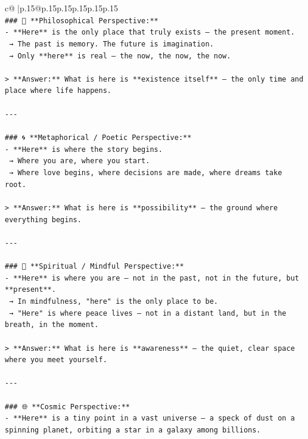 \documentclass{article}
\begin{document}
{\begin{supertabular}{c@{$\;$}|p{.15\linewidth}@{}p{.15\linewidth}p{.15\linewidth}p{.15\linewidth}p{.15\linewidth}p{.15\linewidth}}
{{{\\ 
\texttt{\#\#\# 🌌 **Philosophical Perspective:**} \\
\texttt{{-} **Here** is the only place that truly exists — the present moment.  } \\
\texttt{  → The past is memory. The future is imagination.  } \\
\texttt{  → Only **here** is real — the now, the now, the now.} \\
\\ 
\texttt{> **Answer:** What is here is **existence itself** — the only time and place where life happens.} \\
\\ 
\texttt{{-}{-}{-}} \\
\\ 
\texttt{\#\#\# 🌀 **Metaphorical / Poetic Perspective:**} \\
\texttt{{-} **Here** is where the story begins.  } \\
\texttt{  → Where you are, where you start.  } \\
\texttt{  → Where love begins, where decisions are made, where dreams take root.} \\
\\ 
\texttt{> **Answer:** What is here is **possibility** — the ground where everything begins.} \\
\\ 
\texttt{{-}{-}{-}} \\
\\ 
\texttt{\#\#\# 🧘 **Spiritual / Mindful Perspective:**} \\
\texttt{{-} **Here** is where you are — not in the past, not in the future, but **present**.  } \\
\texttt{  → In mindfulness, "here" is the only place to be.  } \\
\texttt{  → "Here" is where peace lives — not in a distant land, but in the breath, in the moment.} \\
\\ 
\texttt{> **Answer:** What is here is **awareness** — the quiet, clear space where you meet yourself.} \\
\\ 
\texttt{{-}{-}{-}} \\
\\ 
\texttt{\#\#\# 🌐 **Cosmic Perspective:**} \\
\texttt{{-} **Here** is a tiny point in a vast universe — a speck of dust on a spinning planet, orbiting a star in a galaxy among billions.  } \\
}}}
\end{supertabular}}
\end{document}
